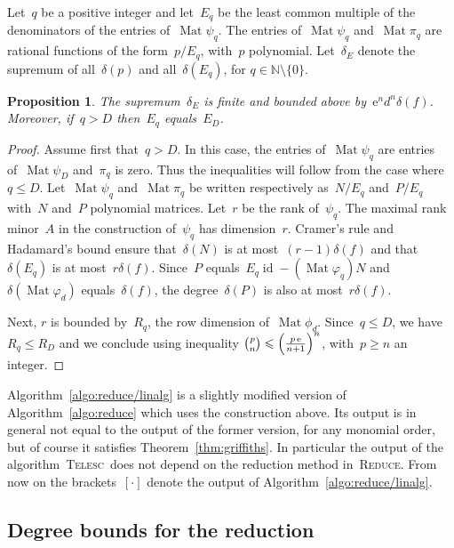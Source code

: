 \documentclass{sig-alternate}
\newtheorem{prop}[thm]{Proposition}
\newcommand{\tReduce}{\textsc{Reduce}}
\newcommand{\tCreatTel}{\textsc{Telesc}}
\DeclareMathOperator{\id}{id}
\DeclareMathOperator{\Mat}{Mat}
\newcommand{\eexp}{\mathrm{e}}
\begin{document}
Let~$q$ be a positive integer and let~$E_q$ be the least common multiple of the denominators of the entries of~$\Mat \psi_q$.
The entries of~$\Mat \psi_q$ and~$\Mat \pi_q$ are rational functions of the form~${p}/{E_q}$, with~$p$ polynomial.
Let~$\delta_E$ denote the supremum of all~$\delta(p)$ and all~$\delta(E_q)$, for $q\in\mathbb{N}\setminus\{0\}$.

\begin{prop}\label{prop:deltaE}
  The supremum~$\delta_E$ is finite and bounded above by~$\eexp^n d^n \delta(f)$. 
  Moreover, if~$q>D$ then~$E_q$ equals~$E_{D}$.
\end{prop}

\begin{proof}
  Assume first that~$q > D$.
  In this case, the entries of~$\Mat \psi_q$ are entries of~$\Mat\psi_{D}$ and~$\pi_q$ is zero.
  Thus the inequalities will follow from the case where~$q\leqslant D$. 
  Let~$\Mat \psi_q$ and~$\Mat \pi_q$ be written respectively as~$N/E_q$ and~$P/E_q$ with~$N$ and~$P$ polynomial matrices.
  Let~$r$ be the rank of~$\psi_q$.
  The maximal rank minor~$A$ in the construction of~$\psi_q$ has dimension~$r$.
  Cramer's rule and Hadamard's bound ensure that~$\delta(N)$ is at most~$(r-1)\delta(f)$ and that~$\delta(E_q)$ is at most~$r\delta(f)$.
  Since~$P$ equals~$E_q\id - (\Mat\varphi_q) N$ and~$\delta(\Mat\varphi_d)$ equals~$\delta(f)$, the degree~$\delta(P)$ is also at most~$r\delta(f)$.

Next, $r$ is bounded by~$R_{q}$, the row dimension of~$\Mat\phi_d$.
Since~$q\leqslant D$, we have~$R_{q}\leqslant R_{D}$ and we conclude using  inequality 
$\tbinom{p}{n}\leqslant\left(\tfrac{p\,\eexp}{n+1}\right)^n$, with~$p\geqslant n$ an integer.
\end{proof}

Algorithm~\ref{algo:reduce/linalg} is a slightly modified version of Algorithm~\ref{algo:reduce} which uses 
the construction above. Its output is in general not equal to the output of the former version, for any monomial order, but of course it satisfies Theorem~\ref{thm:griffiths}. In particular the output of the algorithm~\tCreatTel\ does not depend on the reduction method in~\tReduce.
From now on the brackets~$[\cdot]$ denote the output of Algorithm~\ref{algo:reduce/linalg}.

\subsection{Degree bounds for the reduction}
\end{document}
